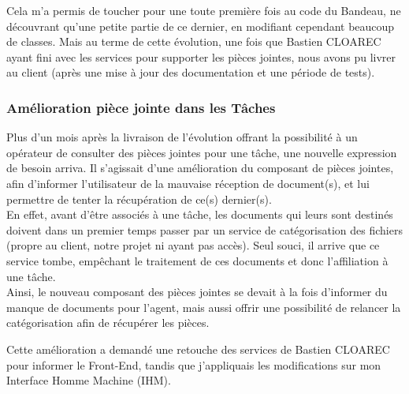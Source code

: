\documentclass{rapport}
\begin{document}

Cela m'a permis de toucher pour une toute première fois au code du Bandeau, ne découvrant qu'une petite partie de ce dernier, en modifiant cependant beaucoup de classes. Mais au terme de cette évolution, une fois que Bastien CLOAREC ayant fini avec les services pour supporter les pièces jointes, nous avons pu livrer au client (après une mise à jour des documentation et une période de tests).\\



\subsubsection{Amélioration pièce jointe dans les Tâches}

Plus d'un mois après la livraison de l'évolution offrant la possibilité à un opérateur de consulter des pièces jointes pour une tâche, une nouvelle expression de besoin arriva. Il s'agissait d'une amélioration du composant de pièces jointes, afin d'informer l'utilisateur de la mauvaise réception de document(s), et lui permettre de tenter la récupération de ce(s) dernier(s).\\

En effet, avant d'être associés à une tâche, les documents qui leurs sont destinés doivent dans un premier temps passer par un service de catégorisation des fichiers (propre au client, notre projet ni ayant pas accès). Seul souci, il arrive que ce service tombe, empêchant le traitement de ces documents et donc l'affiliation à une tâche.\\

Ainsi, le nouveau composant des pièces jointes se devait à la fois d'informer du manque de documents pour l'agent, mais aussi offrir une possibilité de relancer la catégorisation afin de récupérer les pièces.\\


Cette amélioration a demandé une retouche des services de Bastien CLOAREC pour informer le Front-End, tandis que j'appliquais les modifications sur mon Interface Homme Machine (IHM).\\
\end{document}
